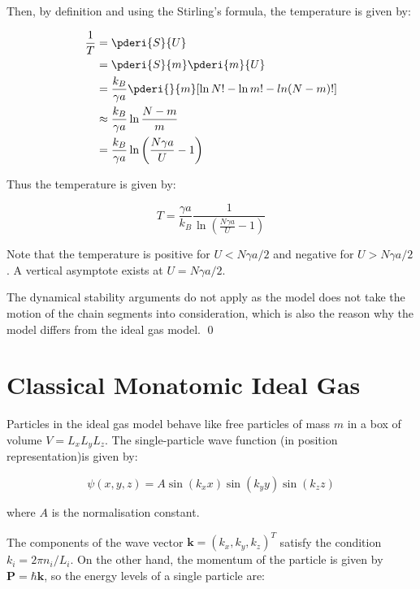 \documentclass[12pt]{article}
\begin{document}
Then, by definition and using the Stirling's formula, the temperature is given by:

\begin{equation}
\begin{split}
\frac{1}{T} &= \pderi{S}{U} \\
            &= \pderi{S}{m} \pderi{m}{U} \\
            &= \frac{k_{B}}{\gamma a} \pderi{}{m} [\ln{N!} - \ln{m!} - ln{(N-m)!}] \\
            &\approx \frac{k_{B}}{\gamma a} \ln{\frac{N-m}{m}} \\
            &= \frac{k_{B}}{\gamma a} \ln{\left( \frac{N \gamma a}{U} - 1 \right)}
\end{split}
\end{equation}

Thus the temperature is given by:

\begin{equation}
T = \frac{\gamma a}{k_{B}} \frac{1}{\ln{\left( \frac{N \gamma a}{U} - 1 \right)}}
\end{equation}

Note that the temperature is positive for $U < N \gamma a/2$ and negative for $U > N \gamma a/2$. A vertical asymptote exists at $U = N \gamma a/2$. 

The dynamical stability arguments do not apply as the model does not take the motion of the chain segments into consideration, which is also the reason why the model differs from the ideal gas model.
\qed


\pagebreak
\section*{Classical Monatomic Ideal Gas}



Particles in the ideal gas model behave like free particles of mass $m$ in a box of volume $V = L_{x}L_{y}L_{z}$. The single-particle wave function (in position representation)is given by:

\begin{equation}
\psi(x, y, z) = A \sin{(k_{x}x)} \sin{(k_{y}y)} \sin{(k_{z}z)}
\end{equation}

where $A$ is the normalisation constant.

The components of the wave vector $\mathbf{k} = (k_{x}, k_{y}, k_{z})^{T}$ satisfy the condition $k_{i} = 2\pi n_{i}/L_{i}$. On the other hand, the momentum of the particle is given by $\mathbf{P} = \hbar \mathbf{k}$, so the energy levels of a single particle are:
\end{document}
